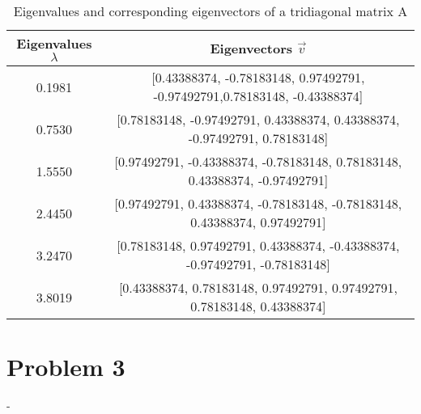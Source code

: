 \documentclass[english,notitlepage]{revtex4-1}  %
\begin{document}
\begin{table}%
    \centering
    \caption{Eigenvalues and corresponding eigenvectors of a tridiagonal matrix A}
    \begin{tabular}{c@{\hspace{1cm}} c}
        \hline
        Eigenvalues $\lambda$ & Eigenvectors $\vec{v}$ \\
        \hline
        0.1981 & [0.43388374, -0.78183148, 0.97492791, -0.97492791,0.78183148, -0.43388374]\\
        0.7530 &  [0.78183148, -0.97492791, 0.43388374, 0.43388374, -0.97492791, 0.78183148]\\
        1.5550 & [0.97492791, -0.43388374, -0.78183148, 0.78183148, 0.43388374, -0.97492791]\\
        2.4450 &  [0.97492791, 0.43388374, -0.78183148, -0.78183148, 0.43388374, 0.97492791]\\
        3.2470 &  [0.78183148, 0.97492791, 0.43388374, -0.43388374, -0.97492791, -0.78183148]\\
        3.8019 & [0.43388374, 0.78183148, 0.97492791, 0.97492791, 0.78183148, 0.43388374]\\
        \hline
    \end{tabular}\label{tab:output_table}
\end{table}

 



\section*{Problem 3}
-
   
\end{document}
